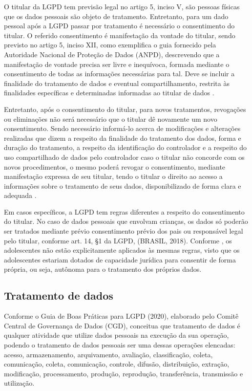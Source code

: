 \documentclass[
	12pt,				%
	openright,			%
	oneside,			%
	a4paper,			%
	english,			%
	french,				%
	spanish,			%
	brazil,				%
	]{abntex2}
\begin{document}
O titular da LGPD tem previsão legal no artigo 5, inciso V, são pessoas físicas que os dados pessoais são objeto de tratamento. Entretanto, para um dado pessoal após a LGPD passar por tratamento é necessário o consentimento do titular. O referido consentimento é manifestação da vontade do titular, sendo previsto no artigo 5, inciso XII, como exemplifica o guia fornecido pela Autoridade Nacional de Proteção de Dados (ANPD), descrevendo que a manifestação de vontade precisa ser livre e inequívoca, formada mediante o consentimento de todas as informações necessárias para tal. Deve se incluir a finalidade do tratamento de dados e eventual compartilhamento, restrita às finalidades específicas e determinadas informadas ao titular de dados \cite{01-01-LeiGeral}.

Entretanto, após o consentimento do titular, para novos tratamentos, revogações ou eliminações não será necessário que o titular dê novamente um novo consentimento. Sendo necessário informá-lo acerca de modificações e alterações realizadas que dizem a respeito da finalidade do tratamento dos dados, forma e duração do tratamento, a respeito da identificação do controlador e a respeito do uso compartilhado de dados pelo controlador \cite{LimaMaldonado2020} caso o titular não concorde com os novos procedimentos, o mesmo poderá revogar o consentimento, mediante manifestação expressa de seu titular, tendo o titular o direito ao acesso a informações sobre o tratamento de seus dados, disponibilizado de forma clara e adequada \cite{Cots2019}.

Em casos específicos, a LGPD tem regras diferentes a respeito do consentimento do titular. No caso de dados pessoais que envolvam crianças, os dados só poderão ser tratados mediante prévio consentimento prévio dos pais ou responsável legal pelo titular, conforme art. 14, §1 da LGPD, (BRASIL, 2018). Conforme , os adolescentes não estão explicitamente aplicados às mesmas regras, visto que os adolescentes estariam dotados de capacidade jurídica para consentir de forma própria, ou seja, autônoma para o tratamento dos próprios dados.
\subsection{Tratamento de dados}

Conforme o Guia de Boas Práticas para LGPD (2020), elaborado pelo Comitê Central de Governança de Dados (CGD), conceitua que tratamento de dados é qualquer atividade que utilize dados pessoais na execução da sua operação, podendo o tratamento de dados pessoais ser uma dessas operações elencadas: acesso, armazenamento, arquivamento, avaliação, classificação, coleta, comunicação, coleta, comunicação, controle, difusão, distribuição, extração, modificação, processamento, produção, reprodução, transferência, transmissão e utilização.
\end{document}

